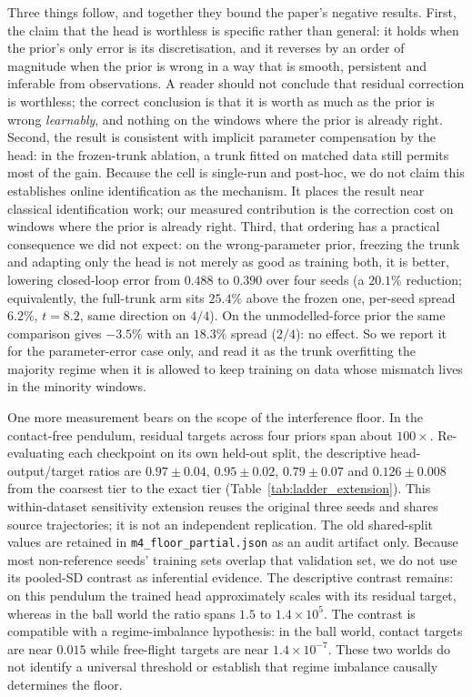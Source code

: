 \documentclass{article}
\begin{document}
Three things follow, and together they bound the paper's negative results. First, the
claim that the head is worthless is specific rather than general: it holds when the
prior's only error is its discretisation, and it reverses by an order of magnitude when
the prior is wrong in a way that is smooth, persistent and inferable from observations.
A reader should not conclude that residual correction is worthless; the correct
conclusion is that it is worth as much as the prior is wrong \emph{learnably}, and
nothing on the windows where the prior is already right. Second, the result is consistent with implicit parameter compensation by the head: in
the frozen-trunk ablation, a trunk fitted on matched data still permits most of the gain.
Because the cell is single-run and post-hoc, we do not claim this establishes online
identification as the mechanism. It places the result near classical identification work;
our measured contribution is the correction cost on windows where the prior is already right. Third, that ordering
has a practical consequence we did not expect: on the wrong-parameter prior, freezing
the trunk and adapting only the head is not merely as good as training both, it is
better, lowering closed-loop error from $0.488$ to $0.390$ over four seeds (a
$20.1\%$ reduction; equivalently, the full-trunk arm sits $25.4\%$ above the frozen
one, per-seed spread $6.2\%$, $t{=}8.2$, same direction on $4/4$). On the unmodelled-force
prior the same comparison gives $-3.5\%$ with an $18.3\%$ spread ($2/4$): no effect. So
we report it for the parameter-error case only, and read it as the trunk overfitting the
majority regime when it is allowed to keep training on data whose mismatch lives in the
minority windows.

One more measurement bears on the scope of the interference floor. In the contact-free pendulum, residual targets across four priors span about $100\times$. Re-evaluating each checkpoint on its own held-out split, the descriptive head-output/target ratios are $0.97 \pm 0.04$, $0.95 \pm 0.02$, $0.79 \pm 0.07$ and $0.126 \pm 0.008$ from the coarsest tier to the exact tier (Table~\ref{tab:ladder_extension}). This within-dataset sensitivity extension reuses the original three seeds and shares source trajectories; it is not an independent replication. The old shared-split values are retained in \texttt{m4\_floor\_partial.json} as an audit artifact only. Because most non-reference seeds' training sets overlap that validation set, we do not use its pooled-SD contrast as inferential evidence. The descriptive contrast remains: on this pendulum the trained head approximately scales with its residual target, whereas in the ball world the ratio spans $1.5$ to $1.4\times10^{5}$. The contrast is compatible with a regime-imbalance hypothesis: in the ball world, contact targets are near $0.015$ while free-flight targets are near $1.4\times10^{-7}$. These two worlds do not identify a universal threshold or establish that regime imbalance causally determines the floor.
\end{document}
